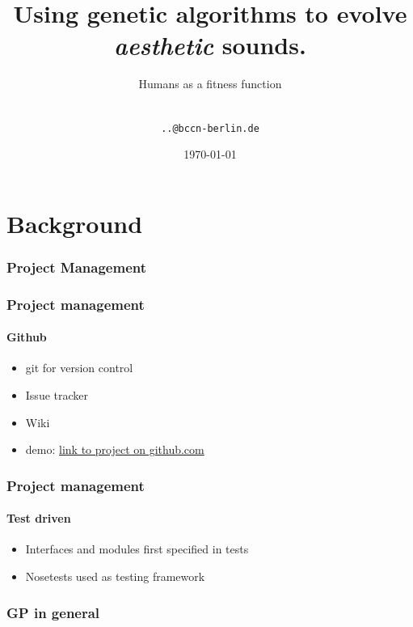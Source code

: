 \documentclass{beamer}
\title[Sound Evolution] {Using genetic algorithms to evolve \emph{aesthetic} sounds.}
\subtitle{Humans as a fitness function}
\author[Duncan, Matthias, Rafael, Mirko \& Stephan] { \\\texttt{..@bccn-berlin.de}}
\date[SS 2010] {\today}
\begin{document}
\frame{\titlepage}



\section{Background} %
\label{sg:sec:background}

\subsubsection{Project Management} %
\label{sg:ssub:architecture_and_project_management}

\begin{frame}
	\frametitle{Project management}
	\framesubtitle{Github}
	
	\begin{itemize}
		\item<1-> git for version control
		\item<2-> Issue tracker
		\item<3-> Wiki
		\item<4-> demo: \href{http://github.com/buzz/sound-evolution}{link to project on github.com}
	\end{itemize}
	
\end{frame}

\begin{frame}
	\frametitle{Project management}
	\framesubtitle{Test driven}
	
	\begin{itemize}
		\item<1-> Interfaces and modules first specified in tests
		\item<2-> Nosetests used as testing framework
	\end{itemize}
	
\end{frame}


\subsubsection{GP in general} %
\label{sg:ssub:gp_in_general}
\end{document}
